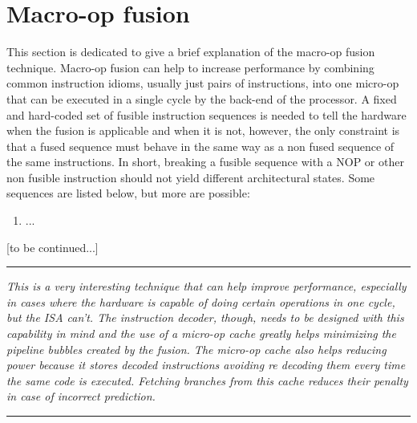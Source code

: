 \section[Macro-op fusion]{Macro-op fusion}

    \vspace{10pt}

    This section is dedicated to give a brief explanation of the macro-op fusion technique. Macro-op fusion can help to increase performance by combining common instruction idioms, usually just pairs of instructions, into one micro-op that can be executed in a single cycle by the back-end of the processor. A fixed and hard-coded set of fusible instruction sequences is needed to tell the hardware when the fusion is applicable and when it is not, however, the only constraint is that a fused sequence must behave in the same way as a non fused sequence of the same instructions. In short, breaking a fusible sequence with a NOP or other non fusible instruction should not yield different architectural states. Some sequences are listed below, but more are possible:

    \begin{enumerate}

        \item ...

    \end{enumerate}

    [to be continued...]

    \par\noindent\rule{\textwidth}{0.4pt}
    \textit{This is a very interesting technique that can help improve performance, especially in cases where the hardware is capable of doing certain operations in one cycle, but the ISA can't. The instruction decoder, though, needs to be designed with this capability in mind and the use of a micro-op cache greatly helps minimizing the pipeline bubbles created by the fusion. The micro-op cache also helps reducing power because it stores decoded instructions avoiding re decoding them every time the same code is executed. Fetching branches from this cache reduces their penalty in case of incorrect prediction.}
    \par\noindent\rule{\textwidth}{0.4pt}